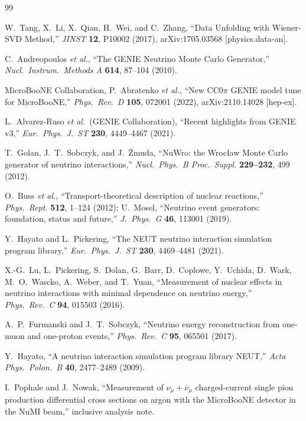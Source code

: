 \documentclass[11pt,a4paper]{article}
\newcommand{\uboone}{MicroBooNE}
\begin{document}
%
\begin{thebibliography}{99}

  W.~Tang, X.~Li, X.~Qian, H.~Wei, and C.~Zhang,
  ``Data Unfolding with Wiener-SVD Method,''
  \textit{JINST} \textbf{12}, P10002 (2017), arXiv:1705.03568 [physics.data-an].

  C.~Andreopoulos \textit{et al.},
  ``The GENIE Neutrino Monte Carlo Generator,''
  \textit{Nucl.\ Instrum.\ Methods A} \textbf{614}, 87--104 (2010).

  MicroBooNE Collaboration, P.~Abratenko \textit{et al.},
  ``New CC0$\pi$ GENIE model tune for MicroBooNE,''
  \textit{Phys.\ Rev.\ D} \textbf{105}, 072001 (2022), arXiv:2110.14028 [hep-ex].

  L.~Alvarez-Ruso \textit{et al.}\ (GENIE Collaboration),
  ``Recent highlights from GENIE v3,''
  \textit{Eur.\ Phys.\ J.\ ST} \textbf{230}, 4449--4467 (2021).

  T.~Golan, J.~T.~Sobczyk, and J.~\.Zmuda,
  ``NuWro: the Wroc\l{}aw Monte Carlo generator of neutrino interactions,''
  \textit{Nucl.\ Phys.\ B Proc.\ Suppl.} \textbf{229--232}, 499 (2012).

  O.~Buss \textit{et al.},
  ``Transport-theoretical description of nuclear reactions,''
  \textit{Phys.\ Rept.} \textbf{512}, 1--124 (2012);
  U.~Mosel, ``Neutrino event generators: foundation, status and future,''
  \textit{J.\ Phys.\ G} \textbf{46}, 113001 (2019).

  Y.~Hayato and L.~Pickering,
  ``The NEUT neutrino interaction simulation program library,''
  \textit{Eur.\ Phys.\ J.\ ST} \textbf{230}, 4469--4481 (2021).

  X.-G.~Lu, L.~Pickering, S.~Dolan, G.~Barr, D.~Coplowe, Y.~Uchida, D.~Wark,
  M.~O.~Wascko, A.~Weber, and T.~Yuan,
  ``Measurement of nuclear effects in neutrino interactions with minimal
  dependence on neutrino energy,''
  \textit{Phys.\ Rev.\ C} \textbf{94}, 015503 (2016).

  A.~P.~Furmanski and J.~T.~Sobczyk,
  ``Neutrino energy reconstruction from one-muon and one-proton events,''
  \textit{Phys.\ Rev.\ C} \textbf{95}, 065501 (2017).

  Y.~Hayato,
  ``A neutrino interaction simulation program library NEUT,''
  \textit{Acta Phys.\ Polon.\ B} \textbf{40}, 2477--2489 (2009).

 I.~Pophale and J.~Nowak, ``Measurement of $\nu_\mu+\bar\nu_\mu$ charged-current single pion
  production differential cross sections on argon with the \uboone{} detector in the NuMI beam,''
  inclusive analysis note.
\end{thebibliography}
\end{document}
